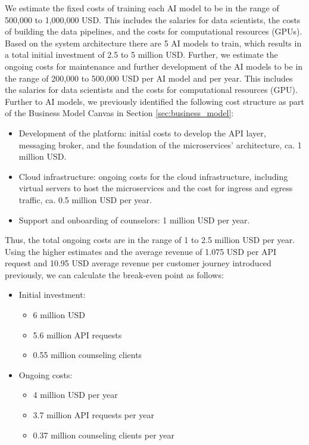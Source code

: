 We estimate the fixed costs of training each AI model to be in the range of 500,000 to 1,000,000 USD.
This includes the salaries for data scientists, the costs of building the data pipelines, and the costs
for computational resources (GPUs). Based on the system architecture there are 5 AI models to train,
which results in a total initial investment of 2.5 to 5 million USD. Further, we estimate the ongoing
costs for maintenance and further development of the AI models to be in the range of 200,000 to 500,000
USD per AI model and per year. This includes the salaries for data scientists and the costs for
computational resources (GPU). Further to AI models, we previously identified the following cost structure
as part of the Business Model Canvas in Section \ref{sec:business_model}:

\begin{itemize}
    \item Development of the platform: initial costs to develop the API layer, messaging broker, and the
        foundation of the microservices' architecture, ca. 1 million USD.
    \item Cloud infrastructure: ongoing costs for the cloud infrastructure, including virtual servers to
        host the microservices and  the cost for ingress and egress traffic, ca. 0.5 million USD per year.
    \item Support and onboarding of counselors: 1 million USD per year.
\end{itemize}

Thus, the total ongoing costs are in the range of 1 to 2.5 million USD per year. Using the higher
estimates and the average revenue of 1.075 USD per API request and 10.95 USD average revenue per customer
journey introduced previously, we can calculate the break-even point as follows:

\begin{itemize}
    \item Initial investment:
    \begin{itemize}
        \item 6 million USD
        \item 5.6 million API requests
        \item 0.55 million counseling clients
    \end{itemize}
    
    \item Ongoing costs:
    \begin{itemize}
        \item 4 million USD per year
        \item 3.7 million API requests per year
        \item 0.37 million counseling clients per year
    \end{itemize}
\end{itemize}

